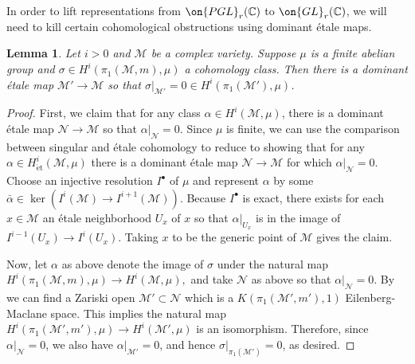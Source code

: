 \documentclass[12 pt]{amsart}
\theoremstyle{plain}
\newtheorem{lemma}[subsubsection]{Lemma}
\theoremstyle{definition}
\theoremstyle{remark}
\numberwithin{equation}{section}
\DeclareMathOperator\Hom{Hom}
\begin{document}
In order to lift representations from
$\on{PGL}_r(\mathbb C)$ to
$\on{GL}_r(\mathbb C)$,
we will need to kill certain cohomological obstructions using dominant \'etale maps.
\begin{lemma}
	\label{lemma:vanish-on-etale}
	Let $i > 0$ and $\mathscr{M}$ be a complex variety. Suppose $\mu$ is a finite abelian group and
	$\sigma \in H^i(\pi_1(\mathscr M, m), \mu)$
	a cohomology class.
	Then there is a dominant \'etale map $\mathscr M' \to \mathscr M$
	so that $\sigma|_{\mathscr M'} =0 \in H^i(\pi_1(\mathscr M'), \mu)$.
\end{lemma}
\begin{proof}
%

First, we claim that for any class
$\alpha \in H^i(\mathscr M, \mu)$,
there is a dominant \'etale map $\mathscr N \to \mathscr M$ so that
$\alpha|_{\mathscr N} = 0$.
Since $\mu$ is finite, we can use the comparison between singular
and \'etale cohomology to reduce to showing that for any
$\alpha \in H^i_{\mathrm{\acute et}}(\mathscr M, \mu)$ there is a dominant \'etale map
$\mathscr N \to \mathscr M$ for which $\alpha|_{\mathscr N}= 0$.
Choose an injective resolution $I^\bullet$ of $\mu$ and represent
$\alpha$ by some $\bar\alpha \in \ker(I^i(\mathscr M) \to I^{i+1}(\mathscr M))$.
Because $I^\bullet$ is exact, there exists for each $x\in \mathscr{M}$ an \'etale neighborhood $U_x$ of $x$  
so that $\alpha|_{U_x}$ is in the image of $I^{i-1}(U_x)\to I^{i}(U_x)$. Taking $x$ to be the generic point of $\mathscr{M}$ gives the claim.

Now, let $\alpha$ as above denote the image of $\sigma$ under the natural map
$H^i(\pi_1(\mathscr M, m), \mu) \to H^i(\mathscr M, \mu),$
and take $\mathscr N$ as above so that $\alpha|_\mathscr N = 0$.
By
\cite[Expos\'e XI, 4.6]{SGA4}
we can find a Zariski open $\mathscr M'
\subset \mathscr N$ which is a 
$K(\pi_1(\mathscr M', m'), 1)$ Eilenberg-Maclane space.
This implies the natural map $H^i(\pi_1(\mathscr M', m'), \mu) \to H^i(\mathscr M', \mu)$
is an isomorphism.
Therefore, since $\alpha|_{\mathscr N} = 0$, we also have $\alpha|_{\mathscr M'}
= 0$, and hence $\sigma|_{\pi_1(\mathscr M')} = 0$, as desired.
\end{proof}
\end{document}
